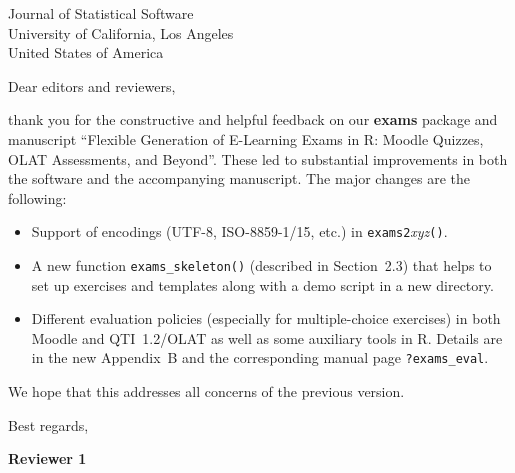 \documentclass[american]{uibkletter}
\begin{document}
\begin{letter}{
Journal of Statistical Software\\
University of California, Los Angeles\\
United States of America}


\opening{Dear editors and reviewers,}

thank you for the constructive and helpful feedback on our \textbf{exams}
package and manuscript
``Flexible Generation of E-Learning Exams in R: Moodle Quizzes, OLAT Assessments, and Beyond''.
These led to substantial improvements in both the software and the accompanying
manuscript. The major changes are the following:
\begin{itemize}
  \item Support of encodings (UTF-8, ISO-8859-1/15, etc.)
        in \texttt{exams2}\emph{xyz}\texttt{()}.

  \item A new function \verb|exams_skeleton()| (described in Section~2.3)
        that helps to set up exercises and templates along with a demo
	script in a new directory.

  \item Different evaluation policies (especially for multiple-choice exercises)
        in both Moodle and QTI~1.2/OLAT as well as some auxiliary tools in \textsf{R}.
	Details are in the new Appendix~B and the corresponding manual page
	\verb|?exams_eval|.
\end{itemize}
We hope that this addresses all concerns of the previous version.


\closing{Best regards,}


\end{letter}

\newpage

\textbf{\Large Reviewer 1}

\medskip
\end{document}
